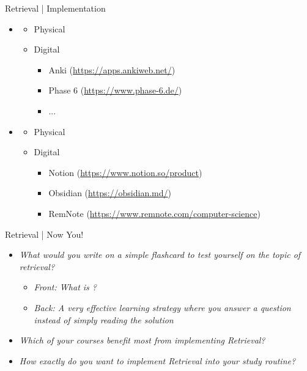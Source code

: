 \documentclass{ercisbeamer}
\begin{document}
\begin{frame}{Retrieval | Implementation}
    \begin{itemize}
        \item {}
        \begin{itemize}
            \item Physical
            \item Digital
            \begin{itemize}
                \item Anki (\url{https://apps.ankiweb.net/})
                \item Phase 6 (\url{https://www.phase-6.de/})
                \item ...
            \end{itemize}
        \end{itemize}
        \item {}
        \begin{itemize}
            \item Physical
            \item Digital 
            \begin{itemize}
                \item Notion (\url{https://www.notion.so/product})
                \item Obsidian (\url{https://obsidian.md/})
                \item RemNote (\url{https://www.remnote.com/computer-science})
            \end{itemize}
        \end{itemize}
    \end{itemize}
\end{frame}

\begin{frame}{Retrieval | Now You!}
    \begin{itemize}
        \item \emph{What would you write on a simple flashcard to test yourself on the topic of retrieval?} \pause
        \begin{itemize}
            \item \emph{Front: What is ?}
            \item \emph{Back: A very effective learning strategy where you answer a question instead of simply reading the solution}
        \end{itemize}
        \item \emph{Which of your courses benefit most from implementing Retrieval?}
        \item \emph{How exactly do you want to implement Retrieval into your study routine?}
    \end{itemize}
\end{frame}
\end{document}
